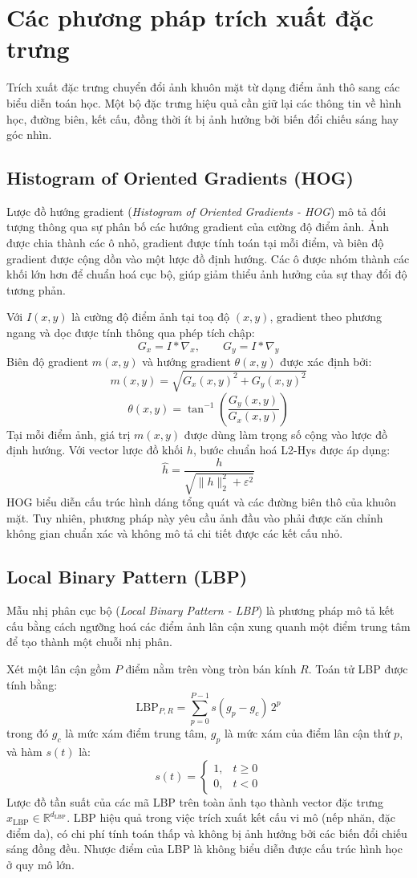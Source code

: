\section{Các phương pháp trích xuất đặc trưng}
Trích xuất đặc trưng chuyển đổi ảnh khuôn mặt từ dạng điểm ảnh thô sang các biểu diễn toán học. Một bộ đặc trưng hiệu quả cần giữ lại các thông tin về hình học, đường biên, kết cấu, đồng thời ít bị ảnh hưởng bởi biến đổi chiếu sáng hay góc nhìn.

\subsection{Histogram of Oriented Gradients (HOG)}
Lược đồ hướng gradient (\textit{Histogram of Oriented Gradients - HOG}) \cite{Dalal2005HOG} mô tả đối tượng thông qua sự phân bố các hướng gradient của cường độ điểm ảnh. Ảnh được chia thành các ô nhỏ, gradient được tính toán tại mỗi điểm, và biên độ gradient được cộng dồn vào một lược đồ định hướng. Các ô được nhóm thành các khối lớn hơn để chuẩn hoá cục bộ, giúp giảm thiểu ảnh hưởng của sự thay đổi độ tương phản.

Với $I(x,y)$ là cường độ điểm ảnh tại toạ độ $(x,y)$, gradient theo phương ngang và dọc được tính thông qua phép tích chập:
\[
G_x = I * \nabla_x, \qquad G_y = I * \nabla_y
\]
Biên độ gradient $m(x,y)$ và hướng gradient $\theta(x,y)$ được xác định bởi:
\[
m(x,y) = \sqrt{G_x(x,y)^2 + G_y(x,y)^2}
\]
\[
\theta(x,y) = \tan^{-1}\!\left(\dfrac{G_y(x,y)}{G_x(x,y)}\right)
\]
Tại mỗi điểm ảnh, giá trị $m(x,y)$ được dùng làm trọng số cộng vào lược đồ định hướng. Với vector lược đồ khối $h$, bước chuẩn hoá L2-Hys được áp dụng:
\[
\hat{h} = \frac{h}{\sqrt{\lVert h \rVert_2^2 + \varepsilon^2}}
\]
HOG biểu diễn cấu trúc hình dáng tổng quát và các đường biên thô của khuôn mặt. Tuy nhiên, phương pháp này yêu cầu ảnh đầu vào phải được căn chỉnh không gian chuẩn xác và không mô tả chi tiết được các kết cấu nhỏ.

\subsection{Local Binary Pattern (LBP)}
Mẫu nhị phân cục bộ (\textit{Local Binary Pattern - LBP}) \cite{Ojala2002LBP} là phương pháp mô tả kết cấu bằng cách ngưỡng hoá các điểm ảnh lân cận xung quanh một điểm trung tâm để tạo thành một chuỗi nhị phân.

Xét một lân cận gồm $P$ điểm nằm trên vòng tròn bán kính $R$. Toán tử LBP được tính bằng:
\[
\mathrm{LBP}_{P,R} = \sum_{p=0}^{P-1} s(g_p-g_c)\,2^p
\]
trong đó $g_c$ là mức xám điểm trung tâm, $g_p$ là mức xám của điểm lân cận thứ $p$, và hàm $s(t)$ là:
\[
s(t)=
\begin{cases}
1, & t\ge 0\\
0, & t<0
\end{cases}
\]
Lược đồ tần suất của các mã LBP trên toàn ảnh tạo thành vector đặc trưng $x_{\mathrm{LBP}} \in \mathbb{R}^{d_{\mathrm{LBP}}}$. LBP hiệu quả trong việc trích xuất kết cấu vi mô (nếp nhăn, đặc điểm da), có chi phí tính toán thấp và không bị ảnh hưởng bởi các biến đổi chiếu sáng đồng đều. Nhược điểm của LBP là không biểu diễn được cấu trúc hình học ở quy mô lớn.

